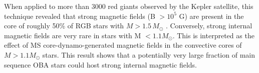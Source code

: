 When applied to more than 3000 red giants observed by the Kepler satellite, this technique revealed that strong magnetic fields (B $> 10^5$ G) are present in the core of roughly 50\% of RGB stars with $M \! > \! 1.5 \, M_\odot$ \citep{Stello_2016,Stello_2016a}. Conversely, strong internal magnetic fields are very rare in stars with M $< 1.1M_\odot$. This is interpreted as the effect of MS core-dynamo-generated magnetic fields in the convective cores of $M> 1.1M_\odot$ stars. This result shows that a potentially very large fraction of main sequence OBA stars could host strong internal magnetic fields.



